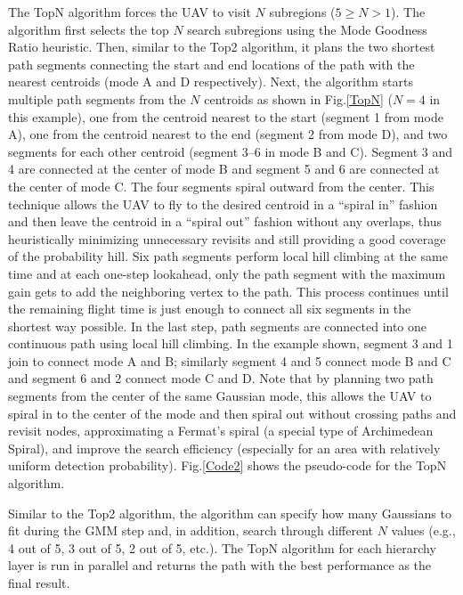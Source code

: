 The TopN algorithm forces the UAV to visit $N$ subregions ($5\!\geq\!N\!>\!1$). The algorithm first selects the top $N$ search subregions using the Mode Goodness Ratio heuristic. Then, similar to the Top2 algorithm, it plans the two shortest path segments connecting the start and end locations of the path with the nearest centroids (mode A and D respectively). Next, the algorithm starts multiple path segments from the $N$ centroids as shown in Fig.\ref{TopN} ($N=4$ in this example), one from the centroid nearest to the start (segment 1 from mode A), one from the centroid nearest to the end (segment 2 from mode D), and two segments for each other centroid (segment 3--6 in mode B and C). Segment 3 and 4 are connected at the center of mode B and segment 5 and 6 are connected at the center of mode C. The four segments spiral outward from the center. This technique allows the UAV to fly to the desired centroid in a ``spiral in'' fashion and then leave the centroid in a ``spiral out'' fashion without any overlaps, thus heuristically minimizing unnecessary revisits and still providing a good coverage of the probability hill. Six path segments perform local hill climbing at the same time and at each one-step lookahead, only the path segment with the maximum gain gets to add the neighboring vertex to the path. This process continues until the remaining flight time is just enough to connect all six segments in the shortest way possible. In the last step, path segments are connected into one continuous path using local hill climbing. In the example shown, segment 3 and 1 join to connect mode A and B; similarly segment 4 and 5 connect mode B and C and segment 6 and 2 connect mode C and D. Note that by planning two path segments from the center of the same Gaussian mode, this allows the UAV to spiral in to the center of the mode and then spiral out without crossing paths and revisit nodes, approximating a Fermat's spiral (a special type of Archimedean Spiral), and improve the search efficiency (especially for an area with relatively uniform detection probability). Fig.\ref{Code2} shows the pseudo-code for the TopN algorithm.

Similar to the Top2 algorithm, the algorithm can specify how many Gaussians to fit during the GMM step and, in addition, search through different $N$ values (e.g., 4 out of 5, 3 out of 5, 2 out of 5, etc.). The TopN algorithm for each hierarchy layer is run in parallel and returns the path with the best performance as the final result.

